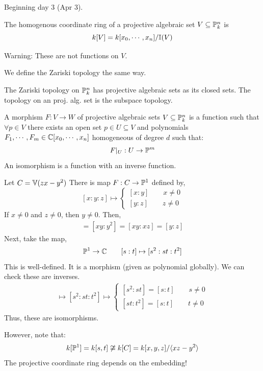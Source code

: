 \documentclass[12pt]{amsart}
\begin{document}
Beginning day 3 (Apr 3). 

\begin{definition}
    The homogenous coordinate ring of a projective algebraic set $V \subseteq \P^n_k$ is 
    \[ k[V] = k[x_0, \cdots, x_n]/\I(V)\]
\end{definition}
Warning: These are not functions on $V$. 

We define the Zariski topology the same way. 
\begin{definition}
    The Zariski topology on $\P^n_k$ has projective algebraic sets as its closed sets. The topology on an proj. alg. set is the subspace topology. 
\end{definition}

\begin{definition}
    A morphism $F: V \to W$ of projective algebraic sets $V \subseteq \P^n_k$ is a function such that $\forall p \in V$ there exists an open set $p \in U \subseteq V$ and polynomials $F_1, \cdots, F_m \in \C[x_0, \cdots, x_n]$ homogeneous of degree $d$ such that: 
    \[ F|_U: U \to \P^m\]
    An isomorphism is a function with an inverse function. 
\end{definition}

\begin{example}
    Let $C = \V(zx-y^2)$ There is map $F: C \to \P^1$ defined by,
    \[ [x:y:z ] \mapsto \begin{cases}
        [x:y] \qquad x \neq 0 \\
        [y:z] \qquad z \neq 0
    \end{cases}\]
    If $x \neq 0$ and $z \neq 0$, then $y \neq 0$. Then, 
    \begin{align*}
        [x: y] = [xy: y^2] = [xy : xz] = [y : z]
    \end{align*}
    Next, take the map, 
    \[ \P^1 \to \C \qquad [s:t] \mapsto [s^2 : st : t^2]\]
    This is well-defined. It is a morphism (given as polynomial globally). We can check these are inverses. 
    \begin{align*}
        [s: t] \mapsto [s^2 : st : t^2] \mapsto \begin{cases}
            [s^2 : st] = [s:t] \qquad s \neq 0 \\
            [st : t^2] = [s:t] \qquad t \neq 0
        \end{cases}
    \end{align*}
    Thus, these are isomorphisms. 

    However, note that: 
    \[ k[\P^1] = k[s, t] \not \cong k[C] = k[x,y,z]/\langle xz -y^2\rangle\]
    The projective coordinate ring depends on the embedding!
\end{example}
\end{document}
